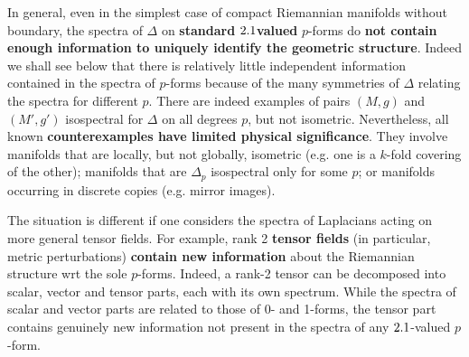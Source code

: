 \begin{mytheorem}
%
In general, even in the simplest case of compact Riemannian manifolds without boundary, the spectra of $\Delta$ on \textbf{standard} $2.1$\textbf{valued} $p$-forms do \textbf{not contain enough information to uniquely identify the geometric structure}.
Indeed we shall see below that there is relatively little independent information contained in the spectra of $p$-forms because of the many symmetries of $\Delta$ relating the spectra for different $p$.
%
There are indeed examples of pairs \((M,g)\) and \((M',g')\) isospectral for \(\Delta\) on all degrees \(p\), but not isometric.
Nevertheless, all known \textbf{counterexamples have limited physical significance}.
They involve manifolds that are locally, but not globally, isometric (e.g.  one is a $k$-fold covering of the other); manifolds that are $\Delta_p$ isospectral only for some $p$; or manifolds occurring in discrete copies (e.g. mirror images).
%

The situation is different if one considers the spectra of Laplacians acting on more general tensor fields.
For example, rank 2 \textbf{tensor fields} (in particular, metric perturbations) \textbf{contain new information} about the Riemannian structure wrt the sole $p$-forms.
Indeed, a rank-2 tensor can be decomposed into scalar, vector and tensor parts, each with its own spectrum.
While the spectra of scalar and vector parts are related to those of 0- and 1-forms, the tensor part contains genuinely new information not present in the spectra of any $2.1$-valued $p$-form.
%
\end{mytheorem}



